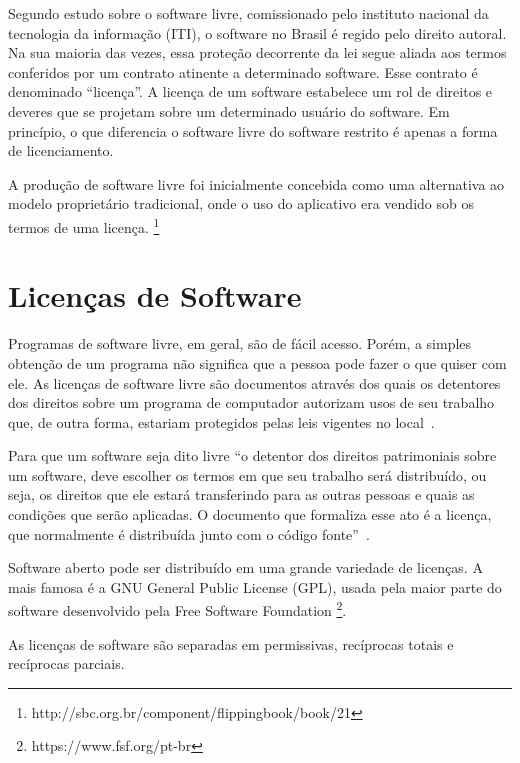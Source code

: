 Segundo estudo sobre o software livre, comissionado pelo instituto nacional da 
tecnologia da informação (ITI), o software no Brasil é regido pelo direito autoral. 
Na sua maioria das vezes, essa proteção decorrente da lei segue aliada aos termos 
conferidos por um contrato atinente a determinado software. Esse contrato é 
denominado ``licença''. A licença de um software estabelece um rol de direitos e 
deveres que se projetam sobre um determinado usuário do software. Em princípio, 
o que diferencia o software livre do software restrito é apenas a forma de
licenciamento. \cite{kon2012software}

A produção de software livre foi inicialmente concebida como
uma alternativa ao modelo proprietário tradicional, onde o uso
do aplicativo era vendido sob os termos de uma licença. \footnote{http://sbc.org.br/component/flippingbook/book/21}


\section{Licenças de Software}

Programas de software livre, em geral, são de fácil acesso. Porém, a simples obtenção
de um programa não significa que a pessoa pode fazer o que quiser com ele. As licenças
de software livre são documentos através dos quais os detentores dos direitos sobre um
programa de computador autorizam usos de seu trabalho que, de outra forma, estariam
protegidos pelas leis vigentes no local~\cite{sabino2009licenccas}.

Para que um software seja dito livre ``o detentor dos direitos patrimoniais 
sobre um software, deve escolher os termos em que seu trabalho será distribuído, 
ou seja, os direitos que ele estará transferindo para as outras pessoas e quais as 
condições que serão aplicadas. O documento que formaliza esse ato é a licença, 
que normalmente é distribuída junto com o código fonte''~\cite{sabino2009licenccas}.

Software aberto pode ser distribuído em uma grande variedade de licenças.
A mais famosa é a GNU General Public License (GPL), usada pela maior
parte do software desenvolvido pela Free Software Foundation \footnote{https://www.fsf.org/pt-br}.

As licenças de software são separadas em permissivas, recíprocas totais e recíprocas
parciais.

